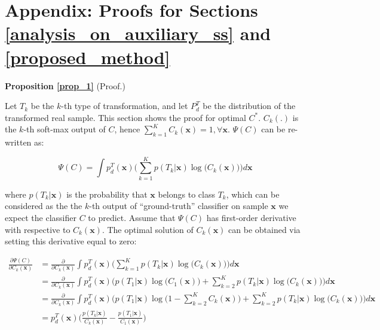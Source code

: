 \documentclass{article}
\begin{document}
\section{Appendix: Proofs for Sections \ref{analysis_on_auxiliary_ss} and \ref{proposed_method}}
\label{appendix_a}

\noindent \textbf{Proposition \ref{prop_1}} (Proof.)

Let $T_k$ be the $k$-th type of transformation, and let $P_d^T$ be the distribution of the transformed real sample.
This section shows the proof for optimal $C^*$. $C_k(.)$ is the $k$-th soft-max output of $C$, hence $\sum_{k=1}^{K}C_k(\mathbf{x}) = 1, \forall \mathbf{x}$. $\Psi(C)$ can be re-written as: 

\begin{equation}
\Psi(C) = \int {p_d^{T}}(\mathbf{x}) \bigg( \sum_{k=1}^{K}p({T_k}|\mathbf{x})\log\Big(C_k(\mathbf{x})\Big)\bigg)d\mathbf{x}
\end{equation}

where $p(T_k|\mathbf{x})$ is the probability that $\mathbf{x}$ belongs to class $T_k$, which can be considered as the the $k$-th output of ``ground-truth'' classifier on sample $\mathbf{x}$ we expect the classifier $C$ to predict. Assume that $\Psi(C)$ has first-order derivative with respective to $C_k(\mathbf{x})$. The optimal solution of $C_k(\mathbf{x})$ can be obtained via setting this derivative equal to zero:

\begin{equation}
\begin{split}
\frac{\partial\Psi(C)}{\partial C_k(\mathbf{x})}
&= \frac{\partial}{\partial C_k(\mathbf{x})} \int {p_d^{T}}(\mathbf{x}) \bigg( \sum_{k=1}^{K}p({T_k}|\mathbf{x})\log\Big(C_k(\mathbf{x})\Big)\bigg)d\mathbf{x}\\
&= \frac{\partial}{\partial C_k(\mathbf{x})} \int {p_d^{T}}(\mathbf{x}) \bigg(p({T_1}|\mathbf{x})\log\Big(C_1(\mathbf{x})\Big) + \sum_{k=2}^{K}p({T_k}|\mathbf{x})\log\Big(C_k(\mathbf{x})\Big)\bigg)d\mathbf{x}\\
&= \frac{\partial}{\partial C_k(\mathbf{x})} \int {p_d^{T}}(\mathbf{x}) \bigg(p({T_1}|\mathbf{x})\log\Big(1 - \sum_{k=2}^{K}C_k(\mathbf{x})\Big) + \sum_{k=2}^{K}p({T_k}|\mathbf{x})\log\Big(C_k(\mathbf{x})\Big)\bigg)d\mathbf{x}\\
&= {p_d^T}(\mathbf{x}) \bigg( \frac{p({T_k}|\mathbf{x})}{C_k(\mathbf{x})} - \frac{p({T_1}|\mathbf{x})}{C_1(\mathbf{x})} \bigg)
\end{split}
\end{equation}
\end{document}
